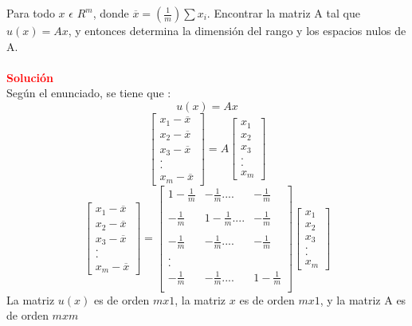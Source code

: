 \documentclass[12pt]{article}
\begin{document}
Para todo $x$ $\epsilon$ $R^m$, donde $\overline{x} = (\frac{1}{m}) \sum x_i$. Encontrar la matriz A tal que $u(x) = Ax$, y entonces determina la dimensión del rango
y los espacios nulos de A.
\\\\
\noindent \textcolor{red}{\bf Soluci\'on}\\
Según el enunciado, se tiene que :
    \[
        u(x) = Ax
    \]
    \[
        \begin{bmatrix}
        x_1 - \overline{x} \\
        x_2 - \overline{x} \\
        x_3 - \overline{x} \\
        .\\
        .\\
        x_m - \overline{x}
        \end{bmatrix} 
        = A
        \begin{bmatrix}
        x_1\\
        x_2\\
        x_3\\
        .\\
        .\\
        x_m
        \end{bmatrix}
    \]
    \[
        \begin{bmatrix}
        x_1 - \overline{x} \\
        x_2 - \overline{x} \\
        x_3 - \overline{x} \\
        .\\
        .\\
        x_m - \overline{x}
        \end{bmatrix} 
        =
        \begin{bmatrix}
        1-\frac{1}{m} & -\frac{1}{m}.... & -\frac{1}{m}\\\\
        -\frac{1}{m} &  1-\frac{1}{m}.... & -\frac{1}{m}\\\\
        -\frac{1}{m} & -\frac{1}{m}.... & -\frac{1}{m}\\\\
        .\\
        .\\
        -\frac{1}{m} & -\frac{1}{m}.... & 1-\frac{1}{m}\\
        \end{bmatrix}
        \begin{bmatrix}
        x_1\\
        x_2\\
        x_3\\
        .\\
        .\\
        x_m
        \end{bmatrix}
    \]
    La matriz $u(x)$ es de orden $mx1$, la matriz $x$ es de orden $mx1$, y la matriz A es de orden $mxm$ 
    
\end{document}
